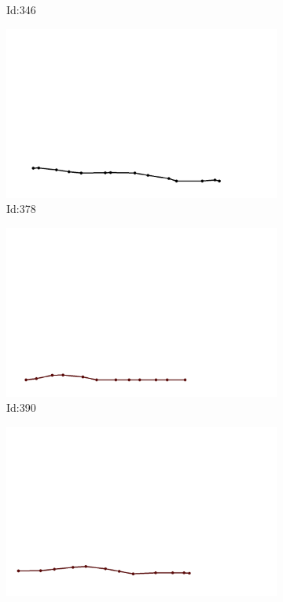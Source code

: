 \documentclass[12pt,twoside]{report}
\begin{document}
\begin{figure}
\begin{subfigure}[b]{0.20\textwidth}
\caption{Id:346}
\end{subfigure}
\begin{subfigure}[b]{0.20\textwidth}
\centering
\includegraphics[width=\textwidth]{../../trajectories/378.png}
\caption{Id:378}
\end{subfigure}
\begin{subfigure}[b]{0.20\textwidth}
\centering
\includegraphics[width=\textwidth]{../../trajectories/390.png}
\caption{Id:390}
\end{subfigure}
\begin{subfigure}[b]{0.20\textwidth}
\centering
\includegraphics[width=\textwidth]{../../trajectories/474.png}

\end{subfigure}
\end{figure}
\end{document}
